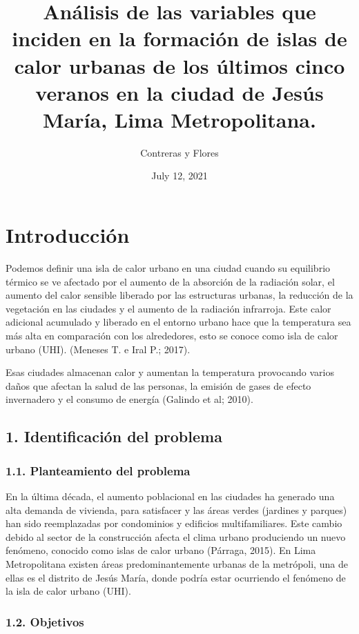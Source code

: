 \documentclass[
]{article}
\title{Análisis de las variables que inciden en la formación de islas de calor
urbanas de los últimos cinco veranos en la ciudad de Jesús María, Lima
Metropolitana.}
\author{Contreras y Flores}
\date{July 12, 2021}
\begin{document}
\maketitle

\hypertarget{introducciuxf3n}{%
\section{Introducción}\label{introducciuxf3n}}

Podemos definir una isla de calor urbano en una ciudad cuando su
equilibrio térmico se ve afectado por el aumento de la absorción de la
radiación solar, el aumento del calor sensible liberado por las
estructuras urbanas, la reducción de la vegetación en las ciudades y el
aumento de la radiación infrarroja. Este calor adicional acumulado y
liberado en el entorno urbano hace que la temperatura sea más alta en
comparación con los alrededores, esto se conoce como isla de calor
urbano (UHI). (Meneses T. e Iral P.; 2017).

Esas ciudades almacenan calor y aumentan la temperatura provocando
varios daños que afectan la salud de las personas, la emisión de gases
de efecto invernadero y el consumo de energía (Galindo et al; 2010).

\hypertarget{identificaciuxf3n-del-problema}{%
\subsection{1. Identificación del
problema}\label{identificaciuxf3n-del-problema}}

\hypertarget{planteamiento-del-problema}{%
\subsubsection{1.1. Planteamiento del
problema}\label{planteamiento-del-problema}}

En la última década, el aumento poblacional en las ciudades ha generado
una alta demanda de vivienda, para satisfacer y las áreas verdes
(jardines y parques) han sido reemplazadas por condominios y edificios
multifamiliares. Este cambio debido al sector de la construcción afecta
el clima urbano produciendo un nuevo fenómeno, conocido como islas de
calor urbano (Párraga, 2015). En Lima Metropolitana existen áreas
predominantemente urbanas de la metrópoli, una de ellas es el distrito
de Jesús María, donde podría estar ocurriendo el fenómeno de la isla de
calor urbano (UHI).

\hypertarget{objetivos}{%
\subsubsection{1.2. Objetivos}\label{objetivos}}
\end{document}
